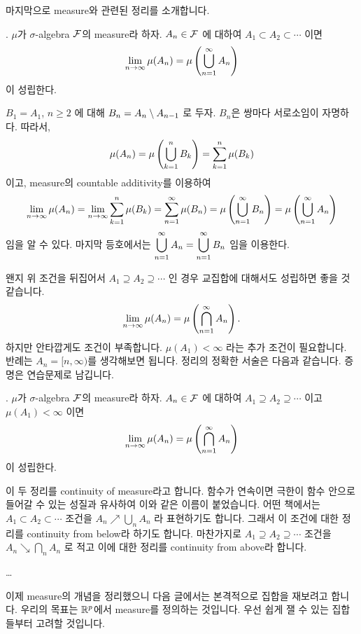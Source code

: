 마지막으로 measure와 관련된 정리를 소개합니다.

\thm. \(\mu\)가 \(\sigma\)-algebra \(\mathcal{F}\)의 measure라 하자. \(A_n \in \mathcal{F}\) 에 대하여 \(A_1 \subset A_2 \subset \cdots\) 이면
\[
    \lim_{n\rightarrow\infty} \mu(A_n) = \mu\left( \bigcup_{n=1}^\infty A_n \right)
\]
이 성립한다.

\pf \(B_1 = A_1\), \(n \geq 2\) 에 대해 \(B_n = A_n \setminus A_{n-1}\) 로 두자. \(B_n\)은 쌍마다 서로소임이 자명하다. 따라서,
\[
    \mu(A_n) = \mu\left( \bigcup_{k=1}^n B_k \right) = \sum_{k=1}^n \mu(B_k)
\]
이고, measure의 countable additivity를 이용하여
\[
    \lim_{n\rightarrow\infty} \mu(A_n) = \lim_{n\rightarrow\infty} \sum_{k=1}^n \mu(B_k) = \sum_{n=1}^\infty \mu(B_n) = \mu\left( \bigcup_{n=1}^{\infty} B_n \right) = \mu\left( \bigcup_{n=1}^\infty A_n \right)
\]
임을 알 수 있다. 마지막 등호에서는 \(\displaystyle \bigcup_{n=1}^\infty A_n = \bigcup_{n=1}^\infty B_n\) 임을 이용한다.

왠지 위 조건을 뒤집어서 \(A_1 \supseteq A_2 \supseteq \cdots\) 인 경우 교집합에 대해서도 성립하면 좋을 것 같습니다.
\[
    \lim_{n\rightarrow\infty} \mu(A_n) = \mu\left( \bigcap_{n=1}^\infty A_n \right).
\]
하지만 안타깝게도 조건이 부족합니다. \(\mu(A_1) < \infty\) 라는 추가 조건이 필요합니다. 반례는 \(A_n = [n, \infty)\)를 생각해보면 됩니다. 정리의 정확한 서술은 다음과 같습니다. 증명은 연습문제로 남깁니다.

\thm. \(\mu\)가 \(\sigma\)-algebra \(\mathcal{F}\)의 measure라 하자. \(A_n \in \mathcal{F}\) 에 대하여 \(A_1 \supseteq A_2 \supseteq \cdots\) 이고 \(\mu(A_1) < \infty\) 이면
\[
    \lim_{n\rightarrow\infty} \mu(A_n) = \mu\left( \bigcap_{n=1}^\infty A_n \right)
\]
이 성립한다.

이 두 정리를 continuity of measure라고 합니다. 함수가 연속이면 극한이 함수 안으로 들어갈 수 있는 성질과 유사하여 이와 같은 이름이 붙었습니다. 어떤 책에서는 \(A_1 \subset A_2 \subset \cdots\) 조건을 \(A_n \nearrow \bigcup_n A_n\) 라 표현하기도 합니다. 그래서 이 조건에 대한 정리를 continuity from below라 하기도 합니다. 마찬가지로 \(A_1 \supseteq A_2 \supseteq \cdots\) 조건을 \(A_n \searrow \bigcap_n A_n\) 로 적고 이에 대한 정리를 continuity from above라 합니다.

\dots

이제 measure의 개념을 정리했으니 다음 글에서는 본격적으로 집합을 재보려고 합니다. 우리의 목표는 \(\mathbb{R}^p\)에서 measure를 정의하는 것입니다. 우선 쉽게 잴 수 있는 집합들부터 고려할 것입니다.

\pagebreak
